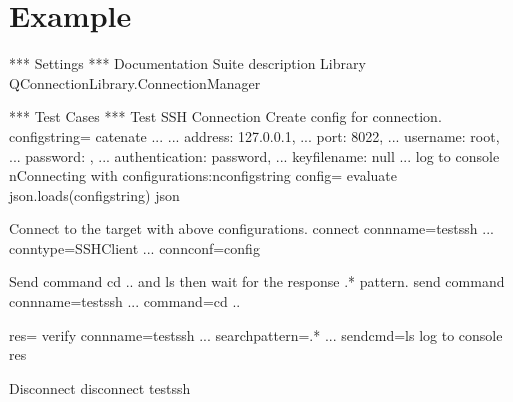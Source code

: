 \documentclass[letterpaper,10pt,english]{sphinxmanual}
\begin{document}
\chapter{Example}
\label{\detokenize{index:example}}
\begin{sphinxVerbatim}[commandchars=\\\{\}]
*** Settings ***
Documentation    Suite description
Library     QConnectionLibrary.ConnectionManager

*** Test Cases ***
Test SSH Connection
    \PYGZsh{} Create config for connection.
    \PYGZdl{}\PYGZob{}config\PYGZus{}string\PYGZcb{}=    catenate
    ...  \PYGZob{}
    ...   \PYGZdq{}address\PYGZdq{}: \PYGZdq{}127.0.0.1\PYGZdq{},
    ...   \PYGZdq{}port\PYGZdq{}: 8022,
    ...   \PYGZdq{}username\PYGZdq{}: \PYGZdq{}root\PYGZdq{},
    ...   \PYGZdq{}password\PYGZdq{}: \PYGZdq{}\PYGZdq{},
    ...   \PYGZdq{}authentication\PYGZdq{}: \PYGZdq{}password\PYGZdq{},
    ...   \PYGZdq{}key\PYGZus{}filename\PYGZdq{}: null
    ...  \PYGZcb{}
    log to console       \PYGZbs{}nConnecting with configurations:\PYGZbs{}n\PYGZdl{}\PYGZob{}config\PYGZus{}string\PYGZcb{}
    \PYGZdl{}\PYGZob{}config\PYGZcb{}=             evaluate        json.loads(\PYGZsq{}\PYGZsq{}\PYGZsq{}\PYGZdl{}\PYGZob{}config\PYGZus{}string\PYGZcb{}\PYGZsq{}\PYGZsq{}\PYGZsq{})    json

    \PYGZsh{} Connect to the target with above configurations.
    connect             conn\PYGZus{}name=test\PYGZus{}ssh
    ...                 conn\PYGZus{}type=SSHClient
    ...                 conn\PYGZus{}conf=\PYGZdl{}\PYGZob{}config\PYGZcb{}

    \PYGZsh{} Send command \PYGZsq{}cd ..\PYGZsq{} and \PYGZsq{}ls\PYGZsq{} then wait for the response \PYGZsq{}.*\PYGZsq{} pattern.
    send command                conn\PYGZus{}name=test\PYGZus{}ssh
    ...                         command=cd ..

    \PYGZdl{}\PYGZob{}res\PYGZcb{}=     verify                  conn\PYGZus{}name=test\PYGZus{}ssh
    ...                                 search\PYGZus{}pattern=.*
    ...                                 send\PYGZus{}cmd=ls
    log to console     \PYGZdl{}\PYGZob{}res\PYGZcb{}

    \PYGZsh{} Disconnect
    disconnect  test\PYGZus{}ssh
\end{sphinxVerbatim}
\end{document}
